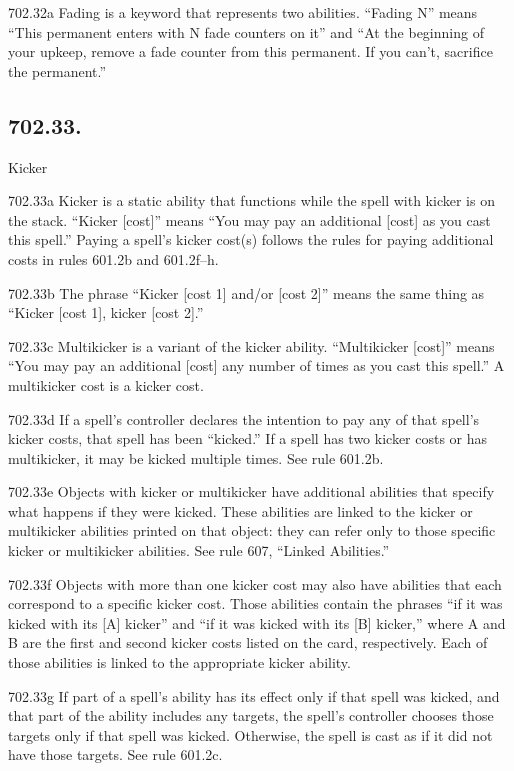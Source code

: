 702.32a Fading is a keyword that represents two abilities. “Fading N” means “This permanent enters with N fade counters on it” and “At the beginning of your upkeep, remove a fade counter from this permanent. If you can’t, sacrifice the permanent.”

\subsection*{702.33.}
Kicker

702.33a Kicker is a static ability that functions while the spell with kicker is on the stack. “Kicker [cost]” means “You may pay an additional [cost] as you cast this spell.” Paying a spell’s kicker cost(s) follows the rules for paying additional costs in rules 601.2b and 601.2f–h.

702.33b The phrase “Kicker [cost 1] and/or [cost 2]” means the same thing as “Kicker [cost 1], kicker [cost 2].”

702.33c Multikicker is a variant of the kicker ability. “Multikicker [cost]” means “You may pay an additional [cost] any number of times as you cast this spell.” A multikicker cost is a kicker cost.

702.33d If a spell’s controller declares the intention to pay any of that spell’s kicker costs, that spell has been “kicked.” If a spell has two kicker costs or has multikicker, it may be kicked multiple times. See rule 601.2b.

702.33e Objects with kicker or multikicker have additional abilities that specify what happens if they were kicked. These abilities are linked to the kicker or multikicker abilities printed on that object: they can refer only to those specific kicker or multikicker abilities. See rule 607, “Linked Abilities.”

702.33f Objects with more than one kicker cost may also have abilities that each correspond to a specific kicker cost. Those abilities contain the phrases “if it was kicked with its [A] kicker” and “if it was kicked with its [B] kicker,” where A and B are the first and second kicker costs listed on the card, respectively. Each of those abilities is linked to the appropriate kicker ability.

702.33g If part of a spell’s ability has its effect only if that spell was kicked, and that part of the ability includes any targets, the spell’s controller chooses those targets only if that spell was kicked. Otherwise, the spell is cast as if it did not have those targets. See rule 601.2c.

